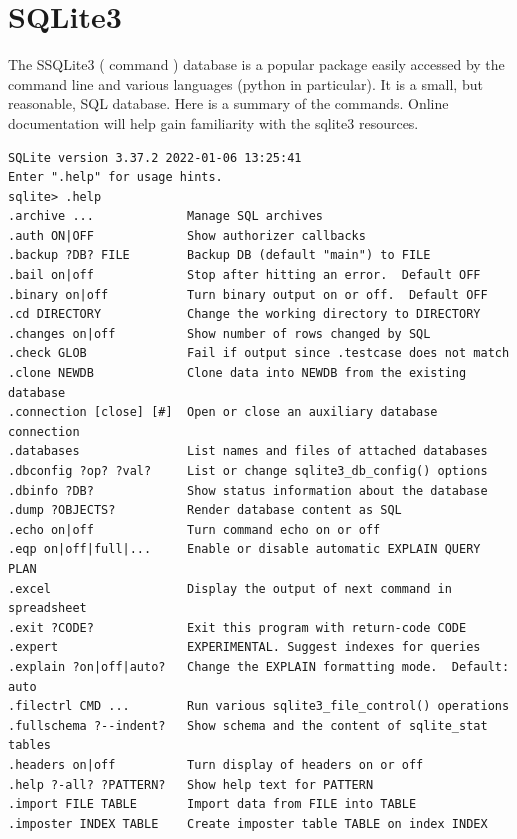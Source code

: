 \renewcommand{\footerfilename}{SQLite3.tex}

\section{SQLite3}

The SSQLite3 ( command  )  database is a popular
package easily accessed by the command line and various languages (python
in particular). It is a small, but reasonable, SQL database. Here is a summary
of the commands. Online documentation will help gain familiarity with the
sqlite3 resources.

\begingroup \fontsize{10pt}{10pt}
\selectfont
\begin{verbatim} 
SQLite version 3.37.2 2022-01-06 13:25:41
Enter ".help" for usage hints.
sqlite> .help
.archive ...             Manage SQL archives
.auth ON|OFF             Show authorizer callbacks
.backup ?DB? FILE        Backup DB (default "main") to FILE
.bail on|off             Stop after hitting an error.  Default OFF
.binary on|off           Turn binary output on or off.  Default OFF
.cd DIRECTORY            Change the working directory to DIRECTORY
.changes on|off          Show number of rows changed by SQL
.check GLOB              Fail if output since .testcase does not match
.clone NEWDB             Clone data into NEWDB from the existing database
.connection [close] [#]  Open or close an auxiliary database connection
.databases               List names and files of attached databases
.dbconfig ?op? ?val?     List or change sqlite3_db_config() options
.dbinfo ?DB?             Show status information about the database
.dump ?OBJECTS?          Render database content as SQL
.echo on|off             Turn command echo on or off
.eqp on|off|full|...     Enable or disable automatic EXPLAIN QUERY PLAN
.excel                   Display the output of next command in spreadsheet
.exit ?CODE?             Exit this program with return-code CODE
.expert                  EXPERIMENTAL. Suggest indexes for queries
.explain ?on|off|auto?   Change the EXPLAIN formatting mode.  Default: auto
.filectrl CMD ...        Run various sqlite3_file_control() operations
.fullschema ?--indent?   Show schema and the content of sqlite_stat tables
.headers on|off          Turn display of headers on or off
.help ?-all? ?PATTERN?   Show help text for PATTERN
.import FILE TABLE       Import data from FILE into TABLE
.imposter INDEX TABLE    Create imposter table TABLE on index INDEX

\end{verbatim}
